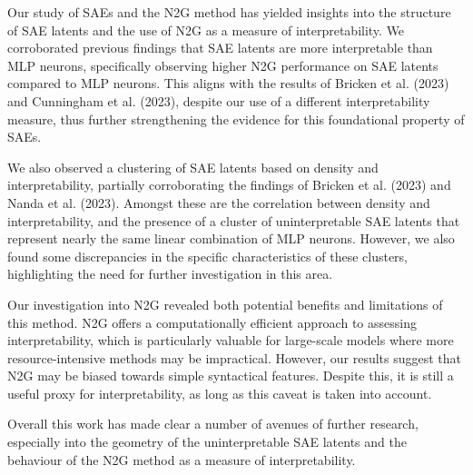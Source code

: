 
Our study of \acp{SAE} and the \ac{N2G} method has yielded insights into the structure of \ac{SAE} latents and the use of \ac{N2G} as a measure of interpretability.
We corroborated previous findings that \ac{SAE} latents are more interpretable than MLP neurons, specifically observing higher \ac{N2G} performance on \ac{SAE} latents compared to MLP neurons.
This aligns with the results of Bricken et al. (2023) and Cunningham et al. (2023), despite our use of a different interpretability measure, thus further strengthening the evidence for this foundational property of \acp{SAE}.

We also observed a clustering of \ac{SAE} latents based on density and interpretability, partially corroborating the findings of Bricken et al. (2023) and Nanda et al. (2023).
Amongst these are the correlation between density and interpretability, and the presence of a cluster of uninterpretable \ac{SAE} latents that represent nearly the same linear combination of \ac{MLP} neurons.
However, we also found some discrepancies in the specific characteristics of these clusters, highlighting the need for further investigation in this area.

Our investigation into \ac{N2G} revealed both potential benefits and limitations of this method.
\ac{N2G} offers a computationally efficient approach to assessing interpretability, which is particularly valuable for large-scale models where more resource-intensive methods may be impractical.
However, our results suggest that \ac{N2G} may be biased towards simple syntactical features.
Despite this, it is still a useful proxy for interpretability, as long as this caveat is taken into account.

Overall this work has made clear a number of avenues of further research, especially into the geometry of the uninterpretable \ac{SAE} latents and the behaviour of the \ac{N2G} method as a measure of interpretability.
